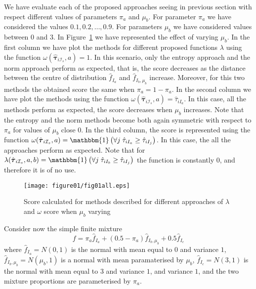 \documentclass[10pt, a4paper]{article}
\newcommand{\m}[1]{\boldsymbol{#1}}
\begin{document}
We have evaluate each of the proposed approaches seeing in previous section with respect different values of parameters $\pi_a$ and $\mu_b$. For parameter $\pi_a$ we have considered the values $0.1, 0.2, \dots, 0.9$. For parameters $\mu_b$ we have considered values between $0$ and $3$. In Figure~\ref{fig:mu_varying} we have represented the effect of varying $\mu_b$. In the first column we have plot the methods for different proposed functions $\lambda$ using the function $\omega(\hat{\m \tau}_{i \mathcal{I}_s}, a) = 1$. In this scenario, only the entropy approach and the norm approach perform as expected, that is, the score decreases as the distance between the centre of distribution $\hat{f}_{I_a}$ and $\hat{f}_{I_b, \mu_b}$ increase. Moreover, for this two methods the obtained score the same when $\pi_a = 1- \pi_a$. In the second column we have plot the methods using the function $\omega(\hat{\m \tau}_{i \mathcal{I}_s}, a) = \hat{\tau}_{iI_a}$. In this case, all the methods perform as expected, the score decreases when $\mu_b$ increases. Note that the entropy and the norm methods become both again symmetric with respect to $\pi_a$ for values of $\mu_b$ close $0$. In the third column, the score is represented using the function $\omega(\hat{\m \tau}_{i \mathcal{I}_s}, a) = \mathbbm{1}\left( \forall j\; \hat{\tau}_{i I_{a}} \geq \hat{\tau}_{iI_j} \right)$. In this case, the all the approaches perform as expected. Note that for $\lambda(\hat{\m \tau}_{i \mathcal{I}_s}, a, b) = \mathbbm{1}\left( \forall j\; \hat{\tau}_{i I_{b}} \geq \hat{\tau}_{iI_j} \right)$ the function is constantly $0$, and therefore it is of no use.

\begin{figure}[!t]
\centering
\texttt{[image: figure01/fig01all.eps]}
\caption{Score calculated for methods described for different approaches of $\lambda$ and $\omega$ score when $\mu_b$ varying}
\label{fig:mu_varying}
\end{figure}

Consider now the simple finite mixture
\begin{equation}\label{three_mixture}
f = \pi_a \hat{f}_{I_a} + (0.5 - \pi_a) \hat{f}_{I_b, \mu_b} + 0.5 \hat{f}_{I_c}
\end{equation}
where $\hat{f}_{I_a} = N(0, 1)$ is the normal with mean equal to $0$ and variance $1$, $\hat{f}_{I_b, \mu_b} = N(\mu_b, 1)$ is a normal with mean paramaterised by $\mu_b$, $\hat{f}_{I_c} = N(3, 1)$ is the normal with mean equal to $3$ and variance $1$,  and variance $1$, and the two mixture proportions are parameterised by $\pi_a$. 
\end{document}
